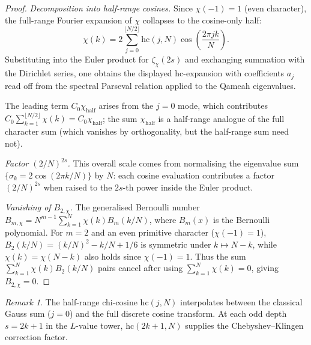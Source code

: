 \documentclass[aps,prd,twocolumn,superscriptaddress,floatfix,nofootinbib]{revtex4-2}
\theoremstyle{definition}
\theoremstyle{remark}
\newtheorem{remark}[theorem]{Remark}
\begin{document}
\begin{proof}
  \emph{Decomposition into half-range cosines.}
  Since $\chi(-1)=1$ (even character), the full-range Fourier expansion of
  $\chi$ collapses to the cosine-only half:
  \[
    \chi(k) = 2\sum_{j=0}^{\lfloor N/2\rfloor} \mathrm{hc}(j,N)\cos\!\left(\frac{2\pi jk}{N}\right).
  \]
  Substituting into the Euler product for $\zeta_\chi(2s)$ and exchanging
  summation with the Dirichlet series, one obtains the displayed
  $\mathrm{hc}$-expansion with coefficients $a_j$ read off from the spectral
  Parseval relation applied to the Qameah eigenvalues.

  The leading term $C_0\chi_{\mathrm{half}}$ arises from the $j=0$ mode,
  which contributes $C_0\sum_{k=1}^{\lfloor N/2\rfloor}\chi(k)=C_0\chi_{\mathrm{half}}$;
  the sum $\chi_{\mathrm{half}}$ is a half-range analogue of the full
  character sum (which vanishes by orthogonality, but the half-range sum
  need not).

  \emph{Factor $(2/N)^{2s}$.}
  This overall scale comes from normalising the eigenvalue sum
  $\{\sigma_k = 2\cos(2\pi k/N)\}$ by $N$: each cosine evaluation
  contributes a factor $(2/N)^{2s}$ when raised to the $2s$-th power
  inside the Euler product.

  \emph{Vanishing of $B_{2,\chi}$.}
  The generalised Bernoulli number $B_{m,\chi} = N^{m-1}\sum_{k=1}^{N}
  \chi(k)B_m(k/N)$, where $B_m(x)$ is the Bernoulli polynomial.  For
  $m=2$ and an even primitive character ($\chi(-1)=1$),
  $B_2(k/N) = (k/N)^2 - k/N + 1/6$ is symmetric under $k\mapsto N-k$,
  while $\chi(k) = \chi(N-k)$ also holds since $\chi(-1)=1$.  Thus the
  sum $\sum_{k=1}^{N}\chi(k)B_2(k/N)$ pairs cancel after using
  $\sum_{k=1}^{N}\chi(k) = 0$, giving $B_{2,\chi} = 0$.
\end{proof}

\begin{remark}
  The half-range chi-cosine $\mathrm{hc}(j,N)$ interpolates between
  the classical Gauss sum ($j=0$) and the full discrete cosine transform.
  At each odd depth $s=2k+1$ in the $L$-value tower, $\mathrm{hc}(2k+1,N)$
  supplies the Chebyshev--Klingen correction factor.
\end{remark}

\end{document}
